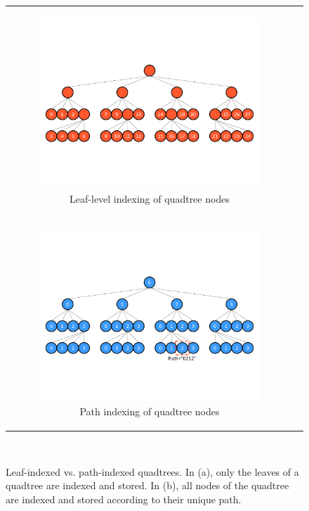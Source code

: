 \begin{figure}
\centering
\begin{tabular}{c c}
\smallskip
    \begin{subfigure}[t]{0.8\textwidth}
        \centering
        \includegraphics[width=\textwidth, clip=true, trim={0 150 0 150}]{figures/leaf_indexing_tree.pdf}
        \caption{Leaf-level indexing of quadtree nodes}
    \end{subfigure}
    \\
    \begin{subfigure}[t]{0.8\textwidth}
        \centering
        \includegraphics[width=\textwidth, clip=true, trim={0 140 0 150}]{figures/global_indexing_tree.pdf}
        \caption{Path indexing of quadtree nodes}
    \end{subfigure}
\end{tabular}\\
\caption{Leaf-indexed vs. path-indexed quadtrees. In (a), only the leaves of a quadtree are indexed and stored. In (b), all nodes of the quadtree are indexed and stored according to their unique path.}
\label{fig:quadtree_indexing}
\end{figure}

